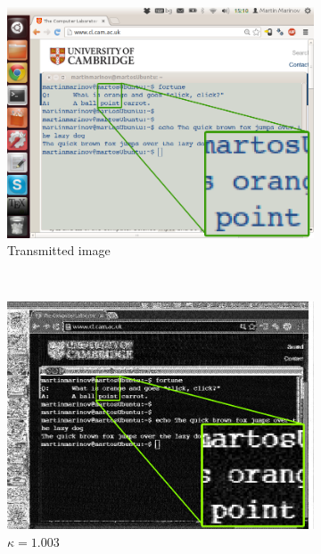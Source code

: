 \documentclass[a4paper,12pt,twoside,openright]{report}
\begin{document}
\begin{figure}[p!]
\centering
\begin{subfigure}[b]{0.45\textwidth}
  \includegraphics[width=\textwidth]{sr_original}
  \caption{Transmitted image}
\end{subfigure} ~
\begin{subfigure}[b]{0.45\textwidth}
  \includegraphics[width=\textwidth]{sr_40MHz_at_190MHz}
  \caption{$\kappa = 1.003$}
\end{subfigure} ~
\begin{subfigure}[b]{0.45\textwidth}

\end{subfigure}
\end{figure}
\end{document}
